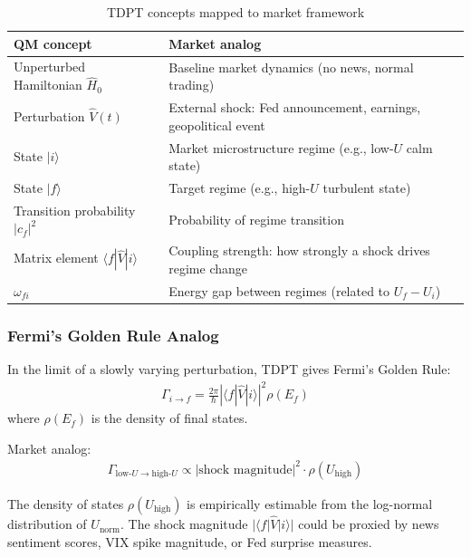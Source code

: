 \documentclass[preprint,12pt]{elsarticle}
\begin{document}
\begin{table}[htbp]
\centering
\caption{TDPT concepts mapped to market framework}
\begin{tabular}{ll}
\toprule
QM concept & Market analog \\
\midrule
Unperturbed Hamiltonian $\hat{H}_0$     & Baseline market dynamics (no news, normal trading) \\
Perturbation $\hat{V}(t)$               & External shock: Fed announcement, earnings, geopolitical event \\
State $|i\rangle$                       & Market microstructure regime (e.g., low-$U$ calm state) \\
State $|f\rangle$                       & Target regime (e.g., high-$U$ turbulent state) \\
Transition probability $|c_f|^2$        & Probability of regime transition \\
Matrix element $\langle f|\hat{V}|i\rangle$ & Coupling strength: how strongly a shock drives regime change \\
$\omega_{fi}$                           & Energy gap between regimes (related to $U_f - U_i$) \\
\bottomrule
\end{tabular}
\end{table}

\subsubsection{Fermi's Golden Rule Analog}

In the limit of a slowly varying perturbation, TDPT gives Fermi's Golden Rule:
\begin{align}
    \Gamma_{i \to f} = \frac{2\pi}{\hbar} \left| \langle f | \hat{V} | i \rangle \right|^2 \rho(E_f)
\end{align}
where $\rho(E_f)$ is the density of final states.

Market analog:
\begin{align}
    \Gamma_{\mathrm{low}\text{-}U \to \mathrm{high}\text{-}U} \propto |\text{shock magnitude}|^2 \cdot \rho(U_{\mathrm{high}})
\end{align}

The density of states $\rho(U_{\mathrm{high}})$ is empirically estimable from the log-normal distribution of $U_\mathrm{norm}$. The shock magnitude $|\langle f|\hat{V}|i\rangle|$ could be proxied by news sentiment scores, VIX spike magnitude, or Fed surprise measures.
\end{document}
